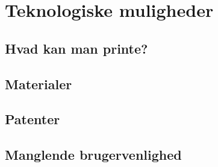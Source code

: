 \section{Teknologiske muligheder} %

\subsection{Hvad kan man printe?} %


\subsection{Materialer} %
\label{sub:materialer}


\subsection{Patenter} %
\label{sub:patenter}


\subsection{Manglende brugervenlighed} %
\label{sub:manglende_brugervenlighed}

